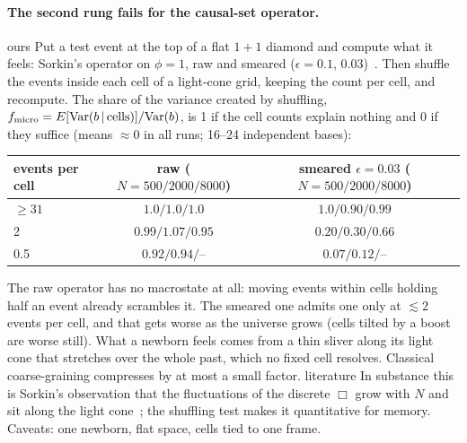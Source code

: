 \documentclass[11pt,a4paper]{article}
\newcommand{\tagbox}[2]{\textsf{\scriptsize\colorbox{#1!12}{\textcolor{#1!70!black}{#2}}}}
\newcommand{\lit}{\tagbox{blue}{literature}}
\newcommand{\ours}{\tagbox{orange}{ours}}
\begin{document}
\paragraph{The second rung fails for the causal-set operator.} \ours{} Put a test event at the top of a flat $1+1$ diamond and compute what it feels: Sorkin's operator on $\phi=1$, raw and smeared ($\epsilon=0.1$, $0.03$)~\cite{Sorkin07}. Then shuffle the events inside each cell of a light-cone grid, keeping the count per cell, and recompute. The share of the variance created by shuffling, $f_{\rm micro}=E[\mathrm{Var}(b\,|\,\text{cells})]/\mathrm{Var}(b)$, is 1 if the cell counts explain nothing and 0 if they suffice (means $\approx0$ in all runs; 16--24 independent bases):
\begin{center}\small
\begin{tabular}{@{}lcc@{}}
\toprule
events per cell & raw ($N=500/2000/8000$) & smeared $\epsilon=0.03$ ($N=500/2000/8000$)\\
\midrule
$\ge31$ & $1.0/1.0/1.0$ & $1.0/0.90/0.99$\\
2 & $0.99/1.07/0.95$ & $0.20/0.30/0.66$\\
0.5 & $0.92/0.94/$-- & $0.07/0.12/$--\\
\bottomrule
\end{tabular}
\end{center}
The raw operator has no macrostate at all: moving events within cells holding half an event already scrambles it. The smeared one admits one only at $\lesssim2$ events per cell, and that gets worse as the universe grows (cells tilted by a boost are worse still). What a newborn feels comes from a thin sliver along its light cone that stretches over the whole past, which no fixed cell resolves. Classical coarse-graining compresses by at most a small factor. \lit{} In substance this is Sorkin's observation that the fluctuations of the discrete $\Box$ grow with $N$ and sit along the light cone~\cite{Sorkin07}; the shuffling test makes it quantitative for memory. Caveats: one newborn, flat space, cells tied to one frame.
\end{document}
